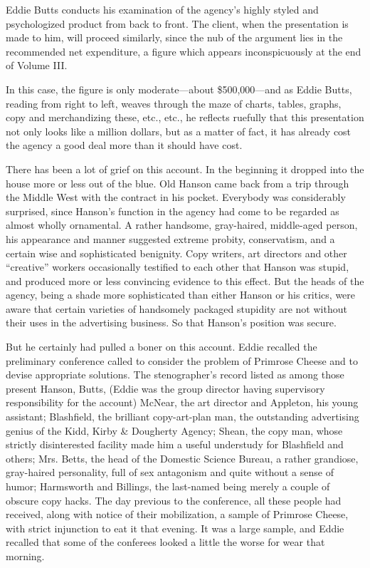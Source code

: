 \documentclass[nohyper,openany,nobib]{tufte-book}
\begin{document}
Eddie Butts conducts his examination of the agency's highly styled and
psychologized product from back to front. The client, when the
presentation is made to him, will proceed similarly, since the nub of
the argument lies in the recommended net expenditure, a figure which
appears inconspicuously at the end of Volume III.

In this case, the figure is only moderate---about \$500,000---and as
Eddie Butts, reading from right to left, weaves through the maze of
charts, tables, graphs, copy and merchandizing these, etc., etc., he
reflects ruefully that this presentation not only looks like a million
dollars, but as a matter of fact, it has already cost the agency a good
deal more than it should have cost.

There has been a lot of grief on this account. In the beginning it
dropped into the house more or less out of the blue. Old Hanson came
back from a trip through the Middle West with the contract in his
pocket. Everybody was considerably surprised, since Hanson's function in
the agency had come to be regarded as almost wholly ornamental. A rather
handsome, gray-haired, middle-aged person, his appearance and manner
suggested extreme probity, conservatism, and a certain wise and
sophisticated benignity. Copy writers, art directors and other
``creative'' workers occasionally testified to each other that Hanson
was stupid, and produced more or less convincing evidence to this
effect. But the heads of the agency, being a shade more sophisticated
than either Hanson or his critics, were aware that certain varieties of
handsomely packaged stupidity are not without their uses in the
advertising business. So that Hanson's position was secure.

But he certainly had pulled a boner on this account. Eddie recalled the
preliminary conference called to consider the problem of Primrose Cheese
and to devise appropriate solutions.
\enlargethispage{\baselineskip}
The stenographer's record listed as among those present Hanson, Butts,
(Eddie was the group director having supervisory responsibility for the
account) McNear, the art director and Appleton, his young assistant;
Blashfield, the brilliant copy-art-plan man, the outstanding advertising
genius of the Kidd, Kirby \& Dougherty Agency; Shean, the copy man,
whose strictly disinterested facility made him a useful understudy for
Blashfield and others; Mrs. Betts, the head of the Domestic Science
Bureau, a rather grandiose, gray-haired personality, full of sex
antagonism and quite without a sense of humor; 
Harmsworth and Billings,
the last-named being merely a couple of obscure copy hacks.
\clearpage
The day previous to the conference, all these people had received, along
with notice of their mobilization, a sample of Primrose Cheese, with
strict injunction to eat it that evening. It was a large sample, and
Eddie recalled that some of the conferees looked a little the worse for
wear that morning.
\end{document}
